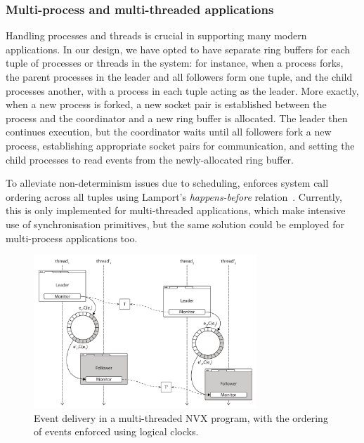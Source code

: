 

\subsubsection{Multi-process and multi-threaded applications}
\label{sec:threading}
\label{sec:ipc}

Handling processes and threads is crucial in supporting many modern
applications.  
In our design, we have opted to have separate ring buffers for each
tuple of processes or threads in the system: for instance, when a
process forks, the parent processes in the leader and all followers
form one tuple, and the child processes another, with a process in
each tuple acting as the leader.  More exactly, when a new process is
forked, a new socket pair is established between the process and the
coordinator and a new ring buffer is allocated.  The leader then
continues execution, but the coordinator waits until all followers
fork a new process, establishing appropriate socket pairs for
communication, and setting the child processes to read events from the
newly-allocated ring buffer.

To alleviate non-determinism issues due to scheduling, \varan enforces
system call ordering across all tuples using Lamport's
\emph{happens-before} relation~\cite{lamport78}. Currently, this is
only implemented for multi-threaded applications, which make intensive
use of synchronisation primitives, but the same solution could be
employed for multi-process applications too.

\begin{figure}[t]
  \begin{center}
    \includegraphics[width=0.75\textwidth]{efficient-execution/figures/multithreading}
    \caption{Event delivery in a multi-threaded NVX program, with
      the ordering of events enforced using logical clocks.}
    \label{fig:multithreaded}
  \end{center}
\end{figure}

